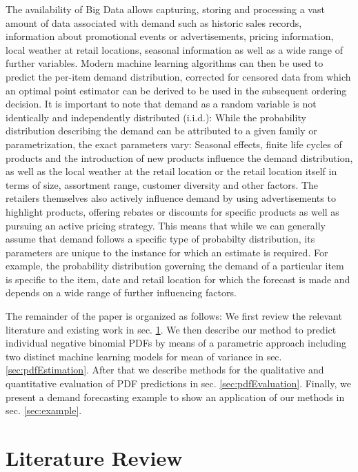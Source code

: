 \documentclass[BCOR=1mm, DIV=calc,10pt,
twoside=true,
twocolumn,
headings=normal]{scrartcl}
\begin{document}
The availability of Big Data allows capturing, storing and processing a vast amount of
data associated with demand such as historic sales records,  information about promotional
events or advertisements, pricing information, local weather at retail locations, seasonal
information  as well as a wide range of further variables. Modern machine learning
algorithms can then be used to predict the per-item demand distribution, corrected for
censored data from which an optimal point estimator can be derived to be used in the
subsequent ordering decision. It is important to note that demand as a random variable is
not identically and independently distributed (i.i.d.): While the probability distribution
describing the demand can be attributed to a given family or parametrization, the exact
parameters vary: Seasonal effects, finite life cycles of products and the introduction of
new products influence the demand distribution, as well as the local weather at the retail
location or the retail location itself in terms of size, assortment range, customer
diversity and other factors. The retailers themselves also actively influence demand by
using advertisements to highlight products, offering rebates or discounts for specific
products as well as pursuing an active pricing strategy. This means that while we can
generally assume that demand follows a specific type of probabilty distribution, its
parameters are unique to the  instance for which an estimate is required. For example, the
probability distribution governing the demand of a particular item is specific to the
item, date and retail location for which the forecast is made and depends on a wide range
of further influencing factors.

The remainder of the paper is organized as follows:
We first review the relevant literature and existing work in sec. \ref{sec:LitRev}.
We then describe our method to predict individual negative binomial PDFs by means of a
parametric approach including two distinct machine learning models for mean of variance in
sec. \ref{sec:pdfEstimation}.
After that we describe methods for the qualitative and quantitative evaluation of PDF
predictions in sec. \ref{sec:pdfEvaluation}.
Finally, we present a demand forecasting example to show an application of our methods in
sec. \ref{sec:example}.


\section{Literature Review}
\label{sec:LitRev}
\end{document}
